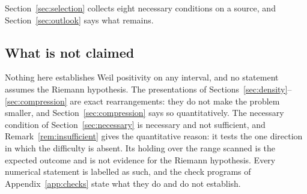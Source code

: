 Section~\ref{sec:selection} collects eight necessary conditions on a source, and
Section~\ref{sec:outlook} says what remains.

\subsection{What is not claimed}
Nothing here establishes Weil positivity on any interval, and no statement
assumes the Riemann hypothesis. The presentations of
Sections~\ref{sec:density}--\ref{sec:compression} are exact rearrangements: they
do not make the problem smaller, and Section~\ref{sec:compression} says so
quantitatively. The necessary condition of Section~\ref{sec:necessary} is
necessary and not sufficient, and Remark~\ref{rem:insufficient} gives the
quantitative reason: it tests the one direction in which the difficulty is
absent. Its holding over the range scanned is the expected outcome and is not
evidence for the Riemann hypothesis. Every numerical statement is labelled as
such, and the check programs of Appendix~\ref{app:checks} state what they do and
do not establish.
